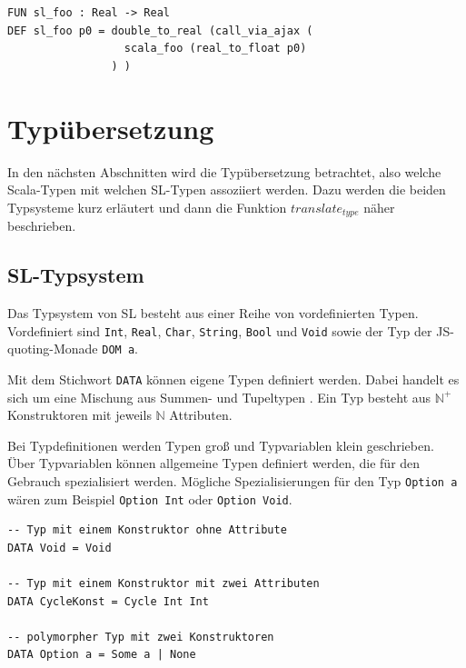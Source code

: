 \documentclass[12pt,bibtotoc]{scrreprt}
\begin{document}
\begin{lstlisting}[caption=Übersetzung von scala\_foo, label=lst:scala-fun-example-translate]
FUN sl_foo : Real -> Real
DEF sl_foo p0 = double_to_real (call_via_ajax (
                  scala_foo (real_to_float p0) 
                ) )
\end{lstlisting}

\section{Typübersetzung}
\label{sec:type-translation}

In den nächsten Abschnitten wird die Typübersetzung betrachtet, also welche Scala-Typen mit welchen SL-Typen assoziiert werden. Dazu werden die beiden Typsysteme kurz erläutert und dann die Funktion $translate_{type}$ näher beschrieben.

\subsection{SL-Typsystem}
\label{subsec:sl-typesystem}

Das Typsystem von SL besteht aus einer Reihe von vordefinierten Typen. Vordefiniert sind \lstinline!Int!, \lstinline!Real!, \lstinline!Char!, \lstinline!String!, \lstinline!Bool! und \lstinline!Void! sowie der Typ der JS-quoting-Monade \lstinline!DOM a!.

Mit dem Stichwort \lstinline!DATA! können eigene Typen definiert werden. Dabei handelt es sich um eine Mischung aus Summen- und Tupeltypen \cite[S.119f u. S. 123]{Pepper2007}. Ein Typ besteht aus $\mathbb{N}^+$ Konstruktoren mit jeweils $\mathbb{N}$ Attributen.

Bei Typdefinitionen werden Typen groß und Typvariablen klein geschrieben. Über Typvariablen können allgemeine Typen definiert werden, die für den Gebrauch spezialisiert werden. Mögliche Spezialisierungen für den Typ \lstinline!Option a! wären zum Beispiel \lstinline!Option Int! oder \lstinline!Option Void!.

\begin{lstlisting}[caption=Beispiele für selbst definierte Datentypen in SL, label=lst:bsp2]
-- Typ mit einem Konstruktor ohne Attribute
DATA Void = Void

-- Typ mit einem Konstruktor mit zwei Attributen
DATA CycleKonst = Cycle Int Int

-- polymorpher Typ mit zwei Konstruktoren 
DATA Option a = Some a | None
\end{lstlisting}
\end{document}
